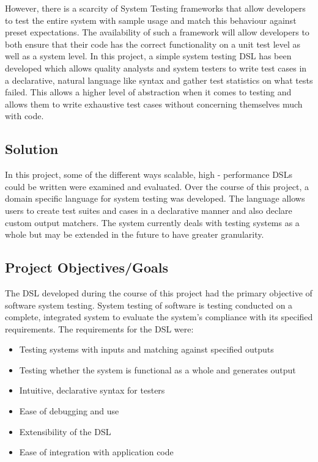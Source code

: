 \documentclass[12 pt]{article}
\begin{document}
\noindent
However, there is a scarcity of System Testing frameworks that allow developers to test the entire system with sample usage and match this behaviour against preset expectations. The availability of such a framework will allow developers to both ensure that their code has the correct functionality on a unit test level as well as a system level. In this project, a simple system testing DSL has been developed which allows quality analysts and system testers to write test cases in a declarative, natural language like syntax and gather test statistics on what tests failed. This allows a higher level of abstraction when it comes to testing and allows them to write exhaustive test cases without concerning themselves much with code.

\subsection{Solution}
In this project, some of the different ways scalable, high - performance DSLs could be written were examined and evaluated. Over the course of this project, a domain specific language for system testing was developed. The language allows users to create test suites and cases in a declarative manner and also declare custom output matchers. The system currently deals with testing systems as a whole but may be extended in the future to have greater granularity.

\subsection{Project Objectives/Goals}
The DSL developed during the course of this project had the primary objective of software system testing. System testing of software is testing conducted on a complete, integrated system to evaluate the system's compliance with its specified requirements. The requirements for the DSL were:
\begin{itemize}
\item Testing systems with inputs and matching against specified outputs
\item Testing whether the system is functional as a whole and generates output
\item Intuitive, declarative syntax for testers
\item Ease of debugging and use
\item Extensibility of the DSL
\item Ease of integration with application code
\end{itemize}
\end{document}
